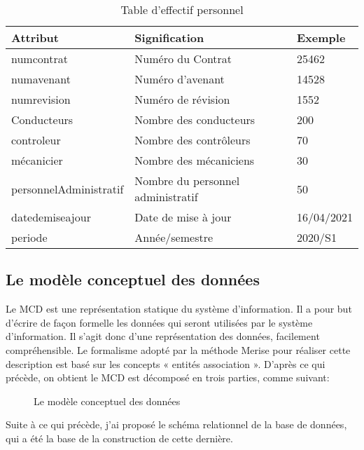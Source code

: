 	\begin{table}[H]
		\begin{center}
			\begin{tabularx}{17.5cm}{|p{4cm}|X|p{2cm}|}
				\hline
				\textbf{Attribut}      & \textbf{Signification}            & \textbf{Exemple} \\
				\hline
				numcontrat             & Numéro du Contrat                 & 25462            \\
				\hline
				numavenant             & Numéro d'avenant                  & 14528            \\
				\hline
				numrevision            & Numéro de révision                & 1552             \\
				\hline
				Conducteurs            & Nombre des conducteurs            & 200              \\
				\hline
				controleur             & Nombre des contrôleurs            & 70               \\
				\hline
				mécanicier             & Nombre des mécaniciens            & 30               \\
				\hline
				personnelAdministratif & Nombre du personnel administratif & 50               \\
				\hline
				datedemiseajour        & Date de mise à jour               & 16/04/2021       \\
				\hline
				periode                & Année/semestre                    & 2020/S1          \\
				\hline
			\end{tabularx}
			\caption{Table d'effectif personnel}
		\end{center}
	\end{table}

	\subsection{Le modèle conceptuel des données}

	Le MCD est une représentation statique du système d’information.
	Il a pour but d’écrire de façon formelle les données qui seront utilisées par le système d’information.
	Il s’agit donc d’une représentation des données, facilement compréhensible.
	Le formalisme adopté par la méthode Merise pour réaliser cette description est basé sur les concepts « entités association ».
	D’après ce qui précède, on obtient le MCD est décomposé en trois parties, comme suivant:
	\begin{figure}[H]
		\begin{center}
			\caption{Le modèle conceptuel des données}
		\end{center}
	\end{figure}
	Suite à ce qui précède, j'ai proposé le schéma relationnel de la base de données, qui a été la base de la construction de cette dernière.

